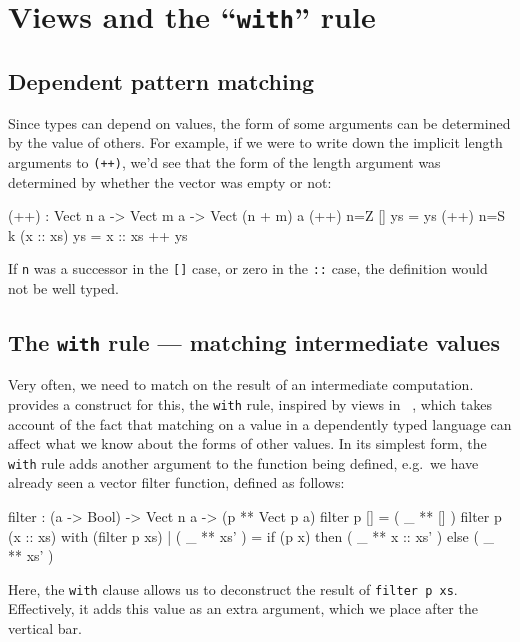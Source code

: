 \section{Views and the ``\texttt{with}'' rule}

\subsection{Dependent pattern matching}

Since types can depend on values, the form of some arguments can be determined by the value of others.
For example, if we were to write down the implicit length arguments to \texttt{(++)}, we'd see that the form of the length argument was determined by whether the vector was empty or not:

\begin{code}
(++) : Vect n a -> Vect m a -> Vect (n + m) a
(++) {n=Z}   []        ys = ys
(++) {n=S k} (x :: xs) ys = x :: xs ++ ys
\end{code}

\noindent
If \texttt{n} was a successor in the \texttt{[]} case, or zero in the  \texttt{::} case, the definition would not be well typed.

\subsection{The \texttt{with} rule --- matching intermediate values}

Very often, we need to match on the result of an intermediate computation.
\Idris{} provides a construct for this, the \texttt{with} rule,  inspired by views in \Epigram~\cite{view-left}, which takes account of the fact that matching on a value in a dependently typed language can affect what we know about the forms of other values.
In its simplest form, the \texttt{with} rule adds another argument to the function being defined, e.g.\ we have already seen a vector filter function, defined as follows:

\begin{code}
filter : (a -> Bool) -> Vect n a -> (p ** Vect p a)
filter p [] = ( _ ** [] )
filter p (x :: xs) with (filter p xs)
  | ( _ ** xs' ) = if (p x) then ( _ ** x :: xs' ) else ( _ ** xs' )
\end{code}

\noindent
Here, the \texttt{with} clause allows us to deconstruct the result of  \texttt{filter p xs}.
Effectively, it adds this value as an extra argument, which we place after the vertical bar.

